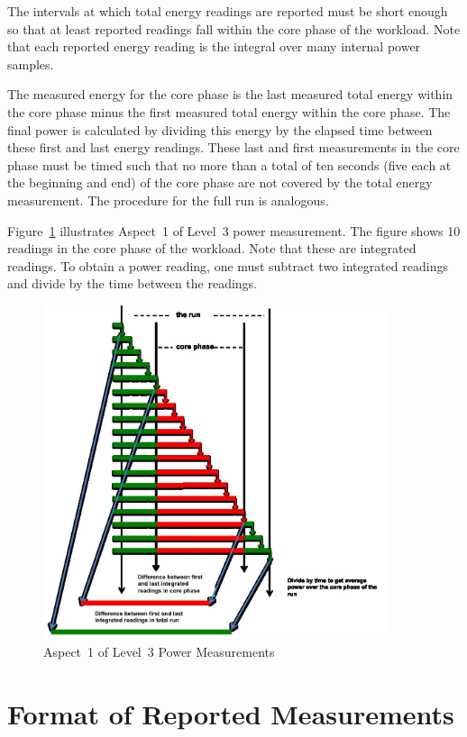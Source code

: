 The intervals at which total energy readings are reported must be short enough so that at least \MinMeasurementsCorePhaseLTwoThree{} reported readings fall within the core phase of the workload.
Note that each reported energy reading is the integral over many internal power samples.

The measured energy for the core phase is the last measured total energy within the core phase minus the first measured total energy within the core phase.
The final power is calculated by dividing this energy by the elapsed time between these first and last energy readings.
These last and first measurements in the core phase must be timed such that no more than a total of ten seconds (five each at the beginning and end) of the core phase are not covered by the total energy measurement.
The procedure for the full run is analogous.

Figure~\ref{fig:a1l3pm} illustrates Aspect~1 of  Level~3 power measurement.
The figure shows \num{10} readings in the core phase of the workload.
Note that these are integrated readings.
To obtain a power reading, one must subtract two integrated readings and divide by the time between the readings.

\begin{figure}[t]
\centering
\includegraphics[width=4in]{fig3-5}
\caption{Aspect~1 of Level~3 Power Measurements}
\label{fig:a1l3pm}
\end{figure}

\section{Format of Reported Measurements}
\label{sec:FoRM}

